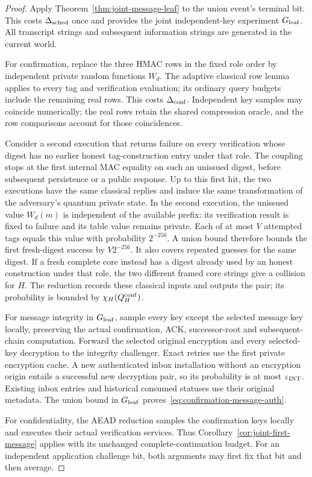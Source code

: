 \begin{proof}
Apply Theorem~\ref{thm:joint-message-leaf} to the union event's terminal
bit. This costs $\Delta_{\rm sched}$ once and provides the joint
independent-key experiment $G_{\rm leaf}$. All transcript strings and
subsequent information strings are generated in the current world.

For confirmation, replace the three HMAC rows in the fixed role order by
independent private random functions $W_d$. The adaptive classical row
lemma applies to every tag and verification evaluation; its ordinary
query budgets include the remaining real rows. This costs
$\Delta_{\rm conf}$. Independent key samples may coincide numerically;
the real rows retain the shared compression oracle, and the row
comparisons account for those coincidences.

Consider a second execution that returns failure on every verification
whose digest has no earlier honest tag-construction entry under that
role. The coupling stops at the first internal MAC equality on such an
unissued digest, before subsequent persistence or a public response.
Up to this first hit, the two executions have
the same classical replies and induce the same transformation of the
adversary's quantum private state. In the second execution, the unissued
value $W_d(m)$ is independent of the available prefix: its verification
result is fixed to failure and its table value remains private. Each
of at most $V$ attempted tags equals this value with probability
$2^{-256}$. A union bound therefore bounds the first fresh-digest
success by $V2^{-256}$. It also covers repeated guesses for the same
digest. If a fresh complete core instead has a digest already used by
an honest construction under that role, the two different framed core
strings give a collision for $H$. The reduction records these classical
inputs and outputs the pair; its probability is bounded by
$\chi_H(Q_H^{\rm conf})$.

For message integrity in $G_{\rm leaf}$, sample every key except the
selected message key locally, preserving the actual confirmation, ACK,
successor-root and subsequent-chain computation. Forward the selected
original encryption and every selected-key decryption to the integrity
challenger. Exact retries use the first private encryption cache. A new
authenticated inbox installation without an encryption origin entails a
successful new decryption pair, so its probability is at most
$\varepsilon_{\rm INT}$. Existing inbox entries and historical consumed
statuses use their original metadata. The union bound in
$G_{\rm leaf}$ proves~\eqref{eq:confirmation-message-auth}.

For confidentiality, the AEAD reduction samples the confirmation keys
locally and executes their actual verification services. Thus
Corollary~\ref{cor:joint-first-message} applies with its unchanged
complete-continuation budget. For an independent application challenge
bit, both arguments may first fix that bit and then average.
\end{proof}

